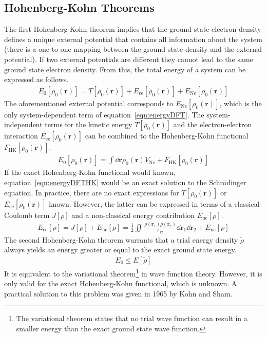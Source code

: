 \subsection{Hohenberg-Kohn Theorems}
\label{sec:HKtheorems}

The first Hohenberg-Kohn theorem implies that the ground state electron density defines a
unique external potential that contains all information about the system
(there is a one-to-one mapping between the ground state density and the external potential). If
two external potentials are different they cannot lead to the same ground state
electron density. From this, the total energy of a system can be expressed as follows.
%
\begin{align}
    E_0\left[ \rho_0(\mathbf{r}) \right] = T\left[ \rho_0(\mathbf{r}) \right] + E_\text{ee} \left[ \rho_0(\mathbf{r}) \right] + E_\text{Ne} \left[ \rho_0(\mathbf{r}) \right]\label{eqn:energyDFT}
\end{align}
%
The aforementioned external potential corresponds to $E_\text{Ne} \left[
    \rho_0(\mathbf{r}) \right]$, which is the only system-dependent term of
equation~\eqref{eqn:energyDFT}. The system-independent terms for the kinetic
energy $T\left[ \rho_0(\mathbf{r}) \right]$ and the electron-electron
interaction $E_\text{ee} \left[ \rho_0(  \mathbf{r}) \right]$ can be combined
to the Hohenberg-Kohn functional $F_\text{HK}\left[ \rho_0(
\mathbf{r})\right]$.
%
\begin{align}
    E_0\left[ \rho_0(\mathbf{r}) \right] = \int\dd\mathbf{r}\rho_0(\mathbf{r})V_\text{Ne}+ F_\text{HK}\left[ \rho_0(\mathbf{r})\right]\label{eqn:energyDFTHK}
\end{align}
%
If the exact Hohenberg-Kohn functional would known,
equation~\eqref{eqn:energyDFTHK} would be an exact solution to the
Schr\"odinger equation. In practice, there are no exact expressions for
$T\left[ \rho_0(\mathbf{r}) \right]$ or $E_\text{ee} \left[ \rho_0(
\mathbf{r}) \right]$ known. However, the latter can be expressed in terms of a
classical Coulomb term $J\left[\rho\right]$ and a non-classical energy contribution
$E_\text{nc}\left[\rho\right]$.
%
\begin{align}
    E_\text{ee} \left[ \rho \right]=J\left[\rho\right]+E_\text{nc}\left[\rho\right]=\frac{1}{2}\iint\frac{\rho(\mathbf{r}_1)\rho(\mathbf{r}_2)}{r_{12}}\dd\mathbf{r}_1\dd\mathbf{r}_2+E_\text{nc}\left[\rho\right]
\end{align}
%
The second Hohenberg-Kohn theorem warrants that a trial energy density
$\widetilde{\rho}$ always yields an energy greater or equal to the exact ground
state energy.
%
\begin{align}
    E_0 \leq E\left[\widetilde{\rho}\right]
\end{align}
%
It is equivalent to the variational theorem\footnote{The variational theorem
states that no trial wave function can result in a smaller energy than the
exact ground state wave function.} in wave function theory. However, it is only
valid for the exact Hohenberg-Kohn functional, which is unknown. A practical
solution to this problem was given in 1965 by Kohn and
Sham.\autocite{Kohn_SelfConsistentEquationsIncluding_1965}

